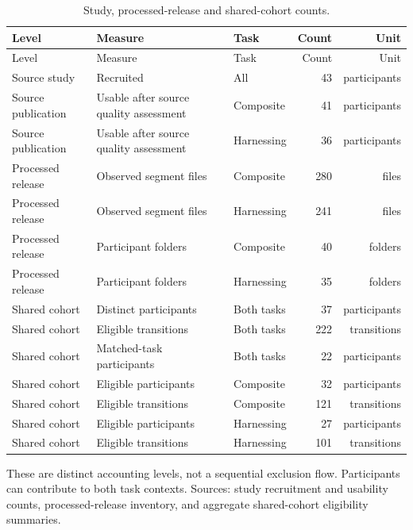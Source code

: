 \begingroup
\scriptsize
\setlength{\tabcolsep}{3pt}
\begin{longtable}{p{2.7cm}p{5.5cm}p{2cm}rr}
\caption{Study, processed-release and shared-cohort counts.}\label{tab:S1}\\
\toprule
Level & Measure & Task & Count & Unit \\
\midrule\endfirsthead
\toprule
Level & Measure & Task & Count & Unit \\
\midrule\endhead
Source study & Recruited & All & 43 & participants \\
Source publication & Usable after source quality assessment & Composite & 41 & participants \\
Source publication & Usable after source quality assessment & Harnessing & 36 & participants \\
Processed release & Observed segment files & Composite & 280 & files \\
Processed release & Observed segment files & Harnessing & 241 & files \\
Processed release & Participant folders & Composite & 40 & folders \\
Processed release & Participant folders & Harnessing & 35 & folders \\
Shared cohort & Distinct participants & Both tasks & 37 & participants \\
Shared cohort & Eligible transitions & Both tasks & 222 & transitions \\
Shared cohort & Matched-task participants & Both tasks & 22 & participants \\
Shared cohort & Eligible participants & Composite & 32 & participants \\
Shared cohort & Eligible transitions & Composite & 121 & transitions \\
Shared cohort & Eligible participants & Harnessing & 27 & participants \\
Shared cohort & Eligible transitions & Harnessing & 101 & transitions \\
\bottomrule
\end{longtable}
\noindent\footnotesize These are distinct accounting levels, not a sequential exclusion flow. Participants can contribute to both task contexts. Sources: study recruitment and usability counts, processed-release inventory, and aggregate shared-cohort eligibility summaries.
\endgroup
